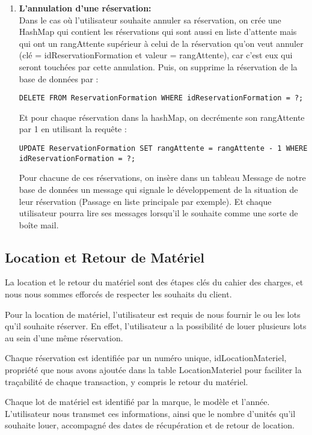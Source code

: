 \begin{enumerate}
    \item \textbf{L’annulation d’une réservation:}\\
Dans le cas où l'utilisateur souhaite annuler sa réservation, on crée une HashMap qui contient les réservations qui sont aussi en liste d'attente mais qui ont un rangAttente supérieur à celui de la réservation qu'on veut annuler (clé = idReservationFormation et valeur = rangAttente), car c'est eux qui seront touchées par cette annulation. Puis, on supprime la réservation de la base de données par : 
\begin{lstlisting}[style=SQL, label=sql-e]
DELETE FROM ReservationFormation WHERE idReservationFormation = ?;
\end{lstlisting}
Et pour chaque réservation dans la hashMap, on decrémente son rangAttente par 1 en utilisant la requête :
\begin{lstlisting}[style=SQL, label=sql-e]
UPDATE ReservationFormation SET rangAttente = rangAttente - 1 WHERE idReservationFormation = ?;
\end{lstlisting}

Pour chacune de ces réservations, on insère dans un tableau Message de notre base de données un message qui signale le développement de la situation de leur réservation (Passage en liste principale par exemple). Et chaque utilisateur pourra lire ses messages lorsqu'il le souhaite comme une sorte de boîte mail.
\end{enumerate}


\subsection{Location et Retour de Matériel}
La location et le retour du matériel sont des étapes clés du cahier des charges, et nous nous sommes efforcés de respecter les souhaits du client.

Pour la location de matériel, l'utilisateur est requis de nous fournir le ou les lots qu'il souhaite réserver. En effet, l'utilisateur a la possibilité de louer plusieurs lots au sein d'une même réservation.

 Chaque réservation est identifiée par un numéro unique, idLocationMateriel, propriété que nous avons ajoutée dans la table LocationMateriel pour faciliter la traçabilité de chaque transaction, y compris le retour du matériel.


Chaque lot de matériel est identifié par la marque, le modèle et l'année.  L'utilisateur nous transmet ces informations, ainsi que le nombre d'unités qu'il souhaite louer, accompagné des dates de récupération et de retour de location.  

